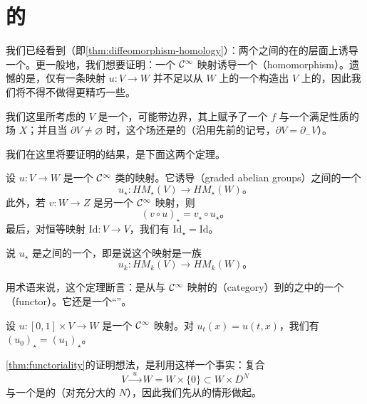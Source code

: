 
\section{\trMorseHomology{}的\trFunctoriality}
\label{sec:functoriality}

我们已经看到（即\cref{thm:diffeomorphism-homology}）：两个\trManifold{}之间的\trDiffeomorphism{}在\trMorseHomology{}的层面上诱导一个\trIsomorphism。更一般地，我们想要证明：一个 $\mathcal{C}^\infty$ 映射诱导一个\textbf{\trHomomorphism}（homomorphism）。遗憾的是，仅有一条映射 $u\colon V\to W$ 并不足以从 $W$ 上的一个\trMorseFunction{}构造出 $V$ 上的\trMorseFunction，因此我们将不得不做得更精巧一些。

我们这里所考虑的\trManifold{} $V$ 是一个\trCompact\trManifold，可能带边界，其上赋予了一个\trMorseFunction{} $f$ 与一个满足\trSmale{}性质的\trPseudogradient{}场 $X$；并且当 $\partial V\neq\varnothing$ 时，这个场还是\trIncoming{}的（沿用先前的记号，$\partial V=\partial_-V$）。

我们在这里将要证明的结果，是下面这两个定理。

\begin{theorem}[\trFunctoriality]\label{thm:functoriality}
设 $u\colon V\to W$ 是一个 $\mathcal{C}^\infty$ 类的映射。它诱导\textbf{\trGraded\trAbelianGroup}（graded abelian groups）之间的一个\trMorphism
\[
u_\star\colon HM_\star(V)\longrightarrow HM_\star(W)\text{。}
\]
此外，若 $v\colon W\to Z$ 是另一个 $\mathcal{C}^\infty$ 映射，则
\[
(v\circ u)_\star=v_\star\circ u_\star\text{。}
\]
最后，对恒等映射 $\mathrm{Id}\colon V\to V$，我们有 $\mathrm{Id}_\star=\mathrm{Id}$。
\end{theorem}

说 $u_\star$ 是\trGraded\trAbelianGroup{}之间的一个\trMorphism，即是说这个映射是一族\trMorphism
\[
u_k\colon HM_k(V)\longrightarrow HM_k(W)\text{。}
\]

用术语来说，这个定理断言：\trMorseHomology{}是从\trDifferential\trManifold{}与 $\mathcal{C}^\infty$ 映射的\textbf{\trCategory}（category）到\trAbelianGroup{}的\trCategory{}之中的一个\textbf{\trFunctor}（functor）。它还是一个“\trHomotopy”\trFunctor。

\begin{theorem}\label{thm:homotopy-invariance}
设 $u\colon[0,1]\times V\to W$ 是一个 $\mathcal{C}^\infty$ 映射。对 $u_t(x)=u(t,x)$，我们有 $(u_0)_\star=(u_1)_\star$。
\end{theorem}

\cref{thm:functoriality}的证明想法，是利用这样一个事实：复合
\[
V\xrightarrow{\ \ u\ \ }W=W\times\{0\}\subset W\times D^N
\]
与一个\trEmbedding{}是\trHomotopic{}的（对充分大的 $N$），因此我们先从\trEmbedding{}的情形做起。

